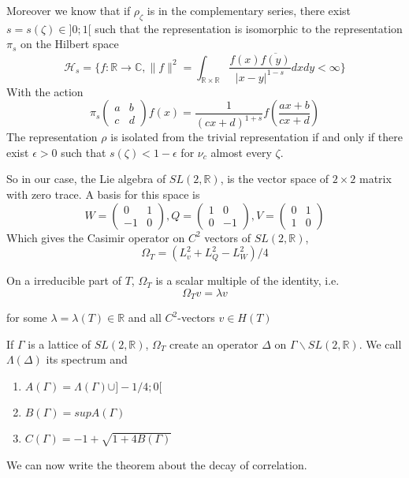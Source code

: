 Moreover we know that if $\rho_\zeta$ is in the complementary series, there exist $s=s(\zeta) \in ]0;1[$ such that the representation is isomorphic to the representation $\pi_s$ on the Hilbert space \[
\mathcal{H}_s =
\{ f:\mathbb{R} \to \mathbb{C}
, \|f \|^2 = \int_{\mathbb{R} \times \mathbb{R}}
 \frac{f(x) \overline{f(y)}}{|x-y|^{1-s}}dxdy < \infty\}
\]
With the action \[
\pi_s \begin{pmatrix}a & b \\c & d \end{pmatrix}f(x)=\frac{1}{(cx+d)^{1+s}}f(\frac{ax+b}{cx+d})
\]
The representation $\rho$ is isolated from the trivial representation if and only if there exist $\epsilon >0$ such that $s(\zeta)<1-\epsilon$ for $\nu_c$ almost every $\zeta$.


So in our case, the Lie algebra of $SL(2,\mathbb{R})$, is the vector space of $2 \times 2$ matrix with zero trace. A basis for this space is \[
W=\begin{pmatrix} 0 & 1 \\ -1 & 0 \end{pmatrix}, Q=\begin{pmatrix} 1 & 0 \\ 0 & -1 \end{pmatrix}, V=\begin{pmatrix} 0 & 1 \\ 1 & 0 \end{pmatrix}
\]
Which gives the Casimir operator on $C^2$ vectors of $SL(2,\mathbb{R})$, \[
\Omega_T = (L_v^2+L_Q^2-L_W^2)/4
\]

On a irreducible part of $T$, $\Omega_T$ is a scalar multiple of the identity, i.e. \[
\Omega_T v = \lambda v
\]

for some $\lambda=\lambda(T)\in \mathbb{R}$ and all $C^2$-vectors $v \in H(T)$

If $\Gamma$ is a lattice of $SL(2,\mathbb{R})$, $\Omega_T$ create an operator $\Delta$ on $\Gamma \backslash SL(2,\mathbb{R})$. We call $\Lambda(\Delta)$ its spectrum and
\begin{enumerate}
\item $A(\Gamma)=\Lambda(\Gamma) \cup ]-1/4;0[$
\item $B(\Gamma)=sup A(\Gamma)$
\item $C(\Gamma)= -1 + \sqrt{1+4 B(\Gamma)}$
\end{enumerate}

We can now write the theorem about the decay of correlation.


